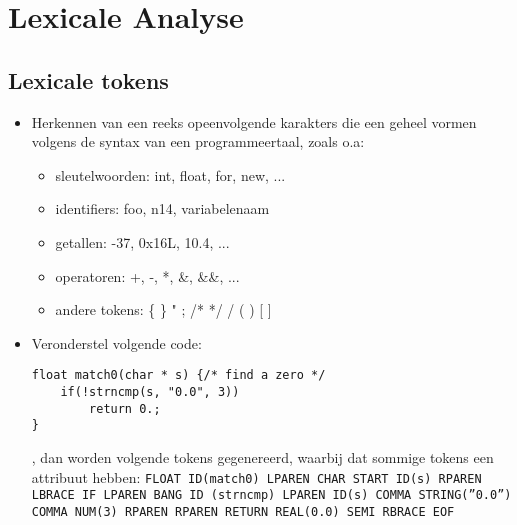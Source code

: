 \chapter{Lexicale Analyse}
\label{ch:lexicale_analyse}
\section{Lexicale tokens}
\begin{itemize}
	\item Herkennen van een reeks opeenvolgende karakters die een geheel vormen volgens de syntax van een programmeertaal, zoals o.a:
	\begin{itemize}
		\item sleutelwoorden: int, float, for, new, ...
		\item identifiers: foo, n14, variabelenaam
		\item getallen: -37, 0x16L, 10.4, ...
		\item operatoren: +, -, *, \&, \&\&, ...
		\item andere tokens: \{ \} " ; /*  */ / ( ) [ ]
	\end{itemize}
	\item Veronderstel volgende code:
	\begin{lstlisting}
float match0(char * s) {/* find a zero */ 
	if(!strncmp(s, "0.0", 3))
		return 0.;
}
	\end{lstlisting}
	, dan worden volgende tokens gegenereerd, waarbij dat sommige tokens een {\color{red}attribuut} hebben:
	\texttt{FLOAT ID({\color{red}match0}) LPAREN CHAR START ID({\color{red}s}) RPAREN LBRACE IF LPAREN BANG ID ({\color{red}strncmp}) LPAREN ID({\color{red}s}) COMMA STRING({\color{red}''0.0''}) COMMA NUM({\color{red}3}) RPAREN RPAREN  RETURN REAL({\color{red}0.0}) SEMI RBRACE EOF}
	\end{itemize}
